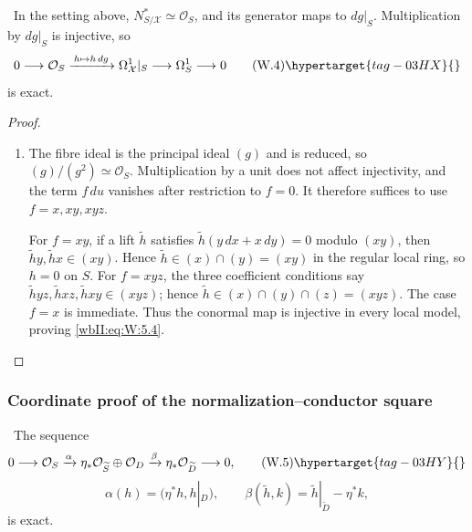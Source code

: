 \ In the setting above, $N^*_{S/\mathcal X}\simeq\mathcal O_S$,
and its generator maps to $dg|_S$.  Multiplication by $dg|_S$ is injective,
so
\[
0\longrightarrow\mathcal O_S
\xrightarrow{\,h\mapsto h\,dg\,}
\Omega^1_{\mathcal X}|_S\longrightarrow\Omega^1_S\longrightarrow0
\tag{W.4}\hypertarget{tag-03HX}{}\label{wbII:eq:W:5.4}
\]
is exact.



\begin{proof}
\begin{enumerate}[label={$\langle1\rangle$\arabic*.},leftmargin=*]
\item 
The fibre ideal is the principal ideal $(g)$ and is reduced, so
$(g)/(g^2)\simeq\mathcal O_S$.  Multiplication by a unit does not affect
injectivity, and the term $f\,du$ vanishes after restriction to $f=0$.
It therefore suffices to use $f=x,xy,xyz$.

For $f=xy$, if a lift $\widetilde h$ satisfies
$\widetilde h(y\,dx+x\,dy)=0$ modulo $(xy)$, then
$\widetilde h y,\widetilde h x\in(xy)$.  Hence
$\widetilde h\in(x)\cap(y)=(xy)$ in the regular local ring, so $h=0$ on
$S$.  For $f=xyz$, the three coefficient conditions say
$\widetilde h yz,\widetilde h xz,\widetilde h xy\in(xyz)$; hence
$\widetilde h\in(x)\cap(y)\cap(z)=(xyz)$.  The case $f=x$ is immediate.
Thus the conormal map is injective in every local model, proving \eqref{wbII:eq:W:5.4}.

\end{enumerate}
\end{proof}

\subsubsection*{Coordinate proof of the normalization--conductor square}


\ The sequence
\[
0\longrightarrow\mathcal O_S
\xrightarrow{\alpha}
\eta_*\mathcal O_{\widetilde S}\oplus\mathcal O_D
\xrightarrow{\beta}
\eta_*\mathcal O_{\widetilde D}
\longrightarrow0,
\tag{W.5}\hypertarget{tag-03HY}{}\label{wbII:eq:W:5.5}
\]
\[
\alpha(h)=(\eta^*h,h|_D),\qquad
\beta(\widetilde h,k)=
\widetilde h|_{\widetilde D}-\eta^*k,
\]
is exact.




